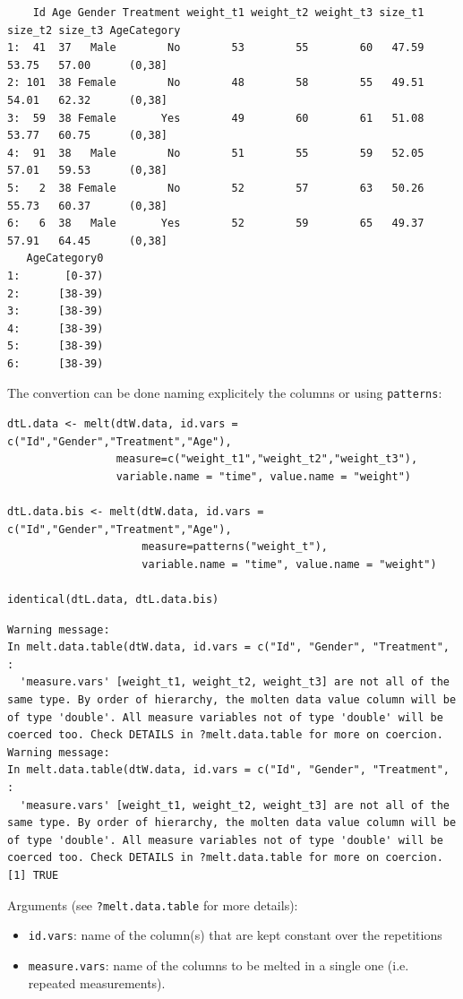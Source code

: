 \documentclass{article}
\begin{document}
\begin{verbatim}
    Id Age Gender Treatment weight_t1 weight_t2 weight_t3 size_t1 size_t2 size_t3 AgeCategory
1:  41  37   Male        No        53        55        60   47.59   53.75   57.00      (0,38]
2: 101  38 Female        No        48        58        55   49.51   54.01   62.32      (0,38]
3:  59  38 Female       Yes        49        60        61   51.08   53.77   60.75      (0,38]
4:  91  38   Male        No        51        55        59   52.05   57.01   59.53      (0,38]
5:   2  38 Female        No        52        57        63   50.26   55.73   60.37      (0,38]
6:   6  38   Male       Yes        52        59        65   49.37   57.91   64.45      (0,38]
   AgeCategory0
1:       [0-37)
2:      [38-39)
3:      [38-39)
4:      [38-39)
5:      [38-39)
6:      [38-39)
\end{verbatim}

The convertion can be done naming explicitely the columns or using \texttt{patterns}:
\lstset{language=r,label= ,caption= ,captionpos=b,numbers=none}
\begin{lstlisting}
dtL.data <- melt(dtW.data, id.vars = c("Id","Gender","Treatment","Age"), 
				 measure=c("weight_t1","weight_t2","weight_t3"), 
				 variable.name = "time", value.name = "weight")

dtL.data.bis <- melt(dtW.data, id.vars = c("Id","Gender","Treatment","Age"), 
					 measure=patterns("weight_t"), 
					 variable.name = "time", value.name = "weight")

identical(dtL.data, dtL.data.bis)
\end{lstlisting}

\begin{verbatim}
Warning message:
In melt.data.table(dtW.data, id.vars = c("Id", "Gender", "Treatment",  :
  'measure.vars' [weight_t1, weight_t2, weight_t3] are not all of the same type. By order of hierarchy, the molten data value column will be of type 'double'. All measure variables not of type 'double' will be coerced too. Check DETAILS in ?melt.data.table for more on coercion.
Warning message:
In melt.data.table(dtW.data, id.vars = c("Id", "Gender", "Treatment",  :
  'measure.vars' [weight_t1, weight_t2, weight_t3] are not all of the same type. By order of hierarchy, the molten data value column will be of type 'double'. All measure variables not of type 'double' will be coerced too. Check DETAILS in ?melt.data.table for more on coercion.
[1] TRUE
\end{verbatim}


Arguments (see \texttt{?melt.data.table} for more details):
\begin{itemize}
\item \texttt{id.vars}: name of the column(s) that are kept constant over the repetitions
\item \texttt{measure.vars}: name of the columns to be melted in a single one
(i.e. repeated measurements).
\end{itemize}
\end{document}
